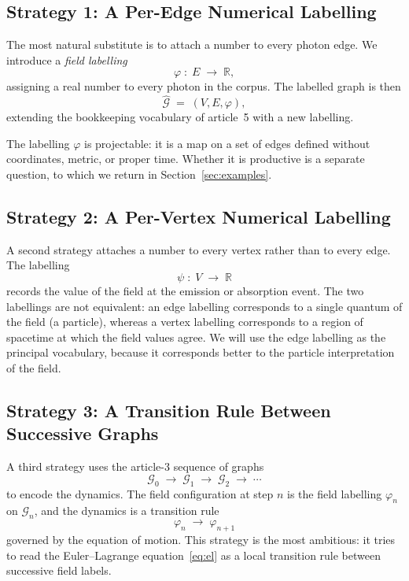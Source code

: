 \documentclass[11pt]{article}
\begin{document}
\subsection{Strategy 1: A Per-Edge Numerical Labelling}

The most natural substitute is to attach a number to every photon edge. We introduce a \emph{field labelling}
\[
\varphi \;:\; E \;\to\; \mathbb{R},
\]
assigning a real number to every photon in the corpus. The labelled graph is then
\[
\widehat{\mathcal{G}} \;=\; (V, E, \varphi),
\]
extending the bookkeeping vocabulary of article~5 with a new labelling.

The labelling $\varphi$ is projectable: it is a map on a set of edges defined without coordinates, metric, or proper time. Whether it is productive is a separate question, to which we return in Section~\ref{sec:examples}.

\subsection{Strategy 2: A Per-Vertex Numerical Labelling}

A second strategy attaches a number to every vertex rather than to every edge. The labelling
\[
\psi \;:\; V \;\to\; \mathbb{R}
\]
records the value of the field at the emission or absorption event. The two labellings are not equivalent: an edge labelling corresponds to a single quantum of the field (a particle), whereas a vertex labelling corresponds to a region of spacetime at which the field values agree. We will use the edge labelling as the principal vocabulary, because it corresponds better to the particle interpretation of the field.

\subsection{Strategy 3: A Transition Rule Between Successive Graphs}

A third strategy uses the article-3 sequence of graphs
\begin{equation}
\mathcal{G}_0 \;\to\; \mathcal{G}_1 \;\to\; \mathcal{G}_2 \;\to\; \cdots
\label{eq:graph-walk}
\end{equation}
to encode the dynamics. The field configuration at step $n$ is the field labelling $\varphi_n$ on $\mathcal{G}_n$, and the dynamics is a transition rule
\[
\varphi_n \;\to\; \varphi_{n+1}
\]
governed by the equation of motion. This strategy is the most ambitious: it tries to read the Euler--Lagrange equation~\eqref{eq:el} as a local transition rule between successive field labels.
\end{document}

